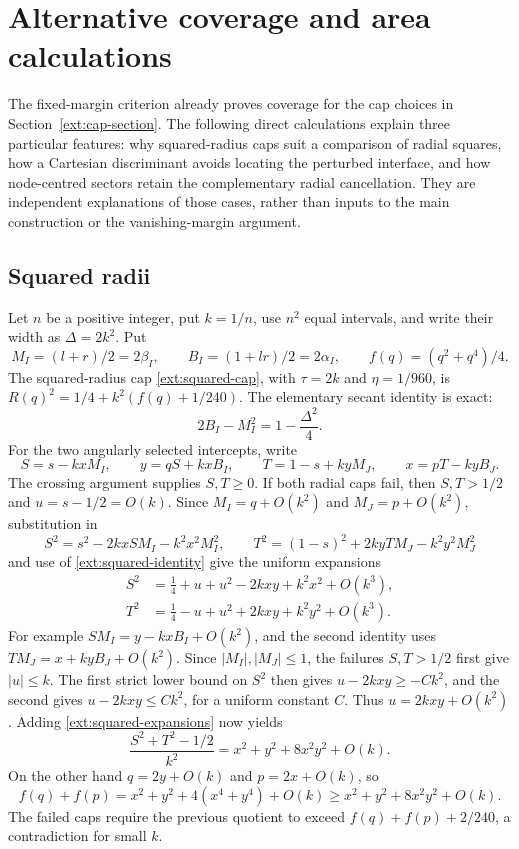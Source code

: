 \section{Alternative coverage and area calculations}
\label{ext:alternate-estimates}

The fixed-margin criterion already proves coverage for the cap choices
in Section~\ref{ext:cap-section}.  The following direct calculations
explain three particular features: why squared-radius caps suit a
comparison of radial squares, how a Cartesian discriminant avoids
locating the perturbed interface, and how node-centred sectors retain
the complementary radial cancellation.  They are independent
explanations of those cases, rather than inputs to the main construction
or the vanishing-margin argument.

\subsection{Squared radii}
\label{ext:squared-direct}
Let $n$ be a positive integer, put $k=1/n$, use $n^2$ equal intervals,
and write their width as
$\Delta=2k^2$.  Put
\[
 M_I=(l+r)/2=2\beta_I,\qquad B_I=(1+lr)/2=2\alpha_I,
 \qquad f(q)=(q^2+q^4)/4.
\]
The squared-radius cap \eqref{ext:squared-cap}, with
$\tau=2k$ and $\eta=1/960$, is
$R(q)^2=1/4+k^2(f(q)+1/240)$.
The elementary secant identity is exact:
\begin{equation}\label{ext:squared-identity}
 2B_I-M_I^2=1-\frac{\Delta^2}{4}.
\end{equation}
For the two angularly selected intercepts, write
\[
 S=s-kxM_I,\qquad y=qS+kxB_I,
 \qquad T=1-s+kyM_J,\qquad x=pT-kyB_J.
\]
The crossing argument supplies $S,T\ge0$.  If both radial caps fail,
then $S,T>1/2$ and $u=s-1/2=O(k)$.
Since $M_I=q+O(k^2)$ and $M_J=p+O(k^2)$, substitution in
\[
 S^2=s^2-2kxSM_I-k^2x^2M_I^2,
 \qquad
 T^2=(1-s)^2+2kyTM_J-k^2y^2M_J^2
\]
and use of \eqref{ext:squared-identity} give the uniform expansions
\begin{align}
 S^2&=\tfrac14+u+u^2-2kxy+k^2x^2+O(k^3),\nonumber\\
 T^2&=\tfrac14-u+u^2+2kxy+k^2y^2+O(k^3).
 \label{ext:squared-expansions}
\end{align}
For example $SM_I=y-kxB_I+O(k^2)$, and the second identity uses
$TM_J=x+kyB_J+O(k^2)$.
Since $|M_I|,|M_J|\le1$, the failures $S,T>1/2$ first give
$|u|\le k$.  The first strict lower bound on $S^2$ then gives
$u-2kxy\ge-Ck^2$, and the second gives
$u-2kxy\le Ck^2$, for a uniform constant $C$.
Thus $u=2kxy+O(k^2)$.  Adding \eqref{ext:squared-expansions} now yields
\[
 \frac{S^2+T^2-1/2}{k^2}
 =x^2+y^2+8x^2y^2+O(k).
\]
On the other hand $q=2y+O(k)$ and $p=2x+O(k)$, so
\[
 f(q)+f(p)=x^2+y^2+4(x^4+y^4)+O(k)
 \ge x^2+y^2+8x^2y^2+O(k).
\]
The failed caps require the previous quotient to exceed
$f(q)+f(p)+2/240$, a contradiction for small $k$.

